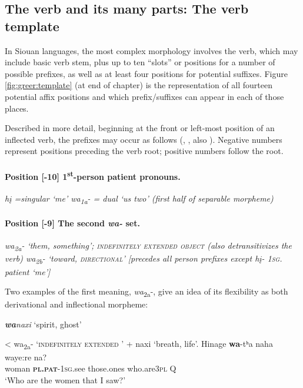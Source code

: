 \documentclass[output=paper]{LSP/langsci}
\begin{document}
\subsection{The verb and its many parts: The verb template}\label{sec:greer:3.2}\label{verbanditsmanyparts}  
	  									                      
In Siouan languages, the most complex morphology involves the verb, which may include basic verb stem, plus up to ten ``slots'' or positions for a number of possible prefixes, as well as at least four positions for potential suffixes.  Figure \ref{fig:greer:template} (at end of chapter) is the representation of all fourteen potential affix positions and which prefix/suffixes can appear in each of those places. 

Described in more detail, beginning at the front or left-most position of an inflected verb, the prefixes may occur as follows (\citealt[246]{Whitman1947}, \citealt{Marsh1936}, also \citealt{HopkinsFurbee1991}). Negative numbers represent positions preceding the verb root; positive numbers follow the root.

\noindent
\paragraph*{Position [-10] 	1\textsuperscript{st}-person patient pronouns.} 	

\ea
\ea  \itshape h\k{i} =singular  {\upshape `me' 												}
\ex  \itshape  wa\textsubscript{1a}- = dual   {\upshape `us two'	 (first half of separable morpheme)					           }
\z
\z


\noindent	
\paragraph*{Position [-9] 	The second \textit{wa-}  set.} 	
										
\ea
\ea  \itshape  wa\textsubscript{2a}-  {\upshape `them, something'; \textsc{indefinitely extended object} (also detransitivizes the verb)		}
\ex  \itshape  wa\textsubscript{2b}- `toward, \textsc{directional}' 	[precedes all person prefixes except \textit{h\k{i}}- 1\textsc{sg}. patient  {\upshape `me'] 	 				      }
\z
\z

Two examples of the first meaning, \textit{wa}\textsubscript{2a}-, give an idea of its flexibility as both derivational and inflectional morpheme:    	

\begin{exe}
\ex
\begin{xlist}
\ex \textit{\textbf{wa}naxi}  {\upshape `spirit, ghost' }

< wa\textsubscript{2a}- `\textsc{indefinitely extended }' + naxi `breath, life'.                  	
\ex \gll Hinage   \textbf{wa}-tʰa  naha   waye:re  na?  \\           			
woman   \textbf{\textsc{pl.pat}}-\textsc{1sg.}see  those.ones who.are\textsc{3pl} Q	\\
\trans `Who are the women that I saw?'
\end{xlist}
\end{exe}
\end{document}
